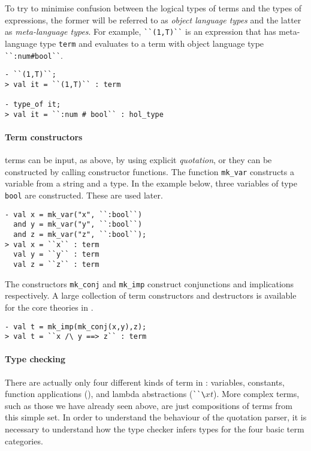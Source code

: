To try to minimise confusion between the logical types of \HOL{} terms and
the \ML{} types of \ML{} expressions, the former will be referred to as {\it object
language types\/} and the latter as {\it meta-language types\/}.  For example,
{\small\verb|``(1,T)``|} is an \ML{} expression that has meta-language type
{\small\verb|term|} and evaluates to a term with object language type
{\small\verb|``:num#bool``|}.
%
\begin{session}
\begin{verbatim}
- ``(1,T)``;
> val it = ``(1,T)`` : term

- type_of it;
> val it = ``:num # bool`` : hol_type
\end{verbatim}
\end{session}
%
\paragraph{Term constructors}
\HOL{} terms can be input, as above, by using explicit {\it
quotation\/}, or they can be constructed by calling \ML{} constructor
functions. The function {\small\verb|mk_var|} constructs a variable
from a string and a type.  In the example below, three variables of
type {\small\verb|bool|} are constructed.  These are used later.

\begin{session}
\begin{verbatim}
- val x = mk_var("x", ``:bool``)
  and y = mk_var("y", ``:bool``)
  and z = mk_var("z", ``:bool``);
> val x = ``x`` : term
  val y = ``y`` : term
  val z = ``z`` : term
\end{verbatim}
\end{session}

The constructors {\small\verb|mk_conj|} and {\small\verb|mk_imp|} construct
conjunctions and implications respectively. A large collection of 
term constructors and destructors is available for the core theories
in \HOL.

\begin{session}
\begin{verbatim}
- val t = mk_imp(mk_conj(x,y),z);
> val t = ``x /\ y ==> z`` : term
\end{verbatim}
\end{session}

\paragraph{Type checking}

There are actually only four different kinds of term in \HOL:
variables, constants, function applications (),
and lambda abstractions ({\small\verb|``\|}$x$$t$).  More
complex terms, such as those we have already seen above, are just
compositions of terms from this simple set. In order to understand
the behaviour of the quotation parser, it is necessary to understand
how the type checker infers types for the four basic term categories.

